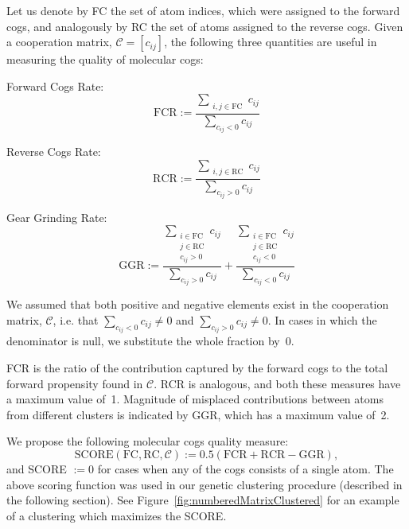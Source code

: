 Let us denote by FC the set of atom indices, which were assigned to the forward cogs, and analogously by RC the set of atoms assigned to the reverse cogs.
Given a cooperation matrix, $\mathcal{C}=[c_{ij}]$, the following three quantities are useful in measuring the quality of molecular cogs:
\begin{packeditemize}
 \item Forward Cogs Rate: \begin{equation} \text{FCR}:= \frac{\sum_{\substack{i,j\in\text{FC}}}c_{ij}}{\sum_{c_{ij}<0}c_{ij}} \end{equation}
 \item Reverse Cogs Rate: \begin{equation} \text{RCR}:= \frac{\sum_{\substack{i,j\in\text{RC}}}c_{ij}}{\sum_{c_{ij}>0}c_{ij}} \end{equation}
 \item Gear Grinding Rate: \begin{equation} \text{GGR}:=\frac{\sum_{\substack{i\in\text{FC}\\ j\in\text{RC}\\ c_{ij}>0}} c_{ij}}{\sum_{c_{ij}>0}c_{ij}} +  \frac{\sum_{\substack{i\in\text{FC}\\ j\in\text{RC}\\ c_{ij}<0}} c_{ij}}{\sum_{c_{ij}<0}c_{ij}} \end{equation}
\end{packeditemize}
We assumed that both positive and negative elements exist in the cooperation matrix, $\mathcal{C}$, i.e. that $\sum_{c_{ij}<0}c_{ij}\neq0$ and $\sum_{c_{ij}>0}c_{ij}\neq0$.
In cases in which the denominator is null, we substitute the whole fraction by~0.

FCR is the ratio of the contribution captured by the forward cogs to the total forward propensity found in $\mathcal{C}$.
RCR is analogous, and both these measures have a maximum value of~1.
Magnitude of misplaced contributions between atoms from different clusters is indicated by GGR, which has a maximum value of~2.

We propose the following molecular cogs quality measure:
\begin{equation}\label{eq:score}
\text{SCORE}(\text{FC},\text{RC}, \mathcal{C}):= 0.5(\text{FCR}+\text{RCR}-\text{GGR}),
\end{equation}
and SCORE $:=0$ for cases when any of the cogs consists of a single atom. 
The above scoring function was used in our genetic clustering procedure (described in the following section).
{\color{black}See Figure~\ref{fig:numberedMatrixClustered} for an example of a clustering which maximizes the SCORE.}

